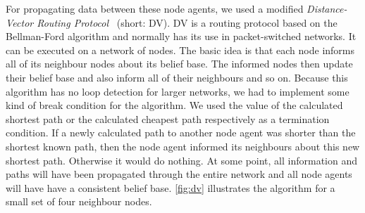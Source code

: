 For propagating data between these node agents, we used a modified \emph{Distance-Vector Routing Protocol}~\cite{dvrp} (short: DV).
DV is a routing protocol based on the Bellman-Ford algorithm and normally has its use in packet-switched networks.
It can be executed on a network of nodes.
The basic idea is that each node informs all of its neighbour nodes about its belief base.
The informed nodes then update their belief base and also inform all of their neighbours and so on.
Because this algorithm has no loop detection for larger networks, we had to implement some kind of break condition for the algorithm.
We used the value of the calculated shortest path or the calculated cheapest path respectively as a termination condition.
If a newly calculated path to another node agent was shorter than the shortest known path, then the node agent informed its neighbours about this new shortest path.
Otherwise it would do nothing.
At some point, all information and paths will have been propagated through the entire network and all node agents will have have a consistent belief base.
\autoref{fig:dv} illustrates the algorithm for a small set of four neighbour nodes.

